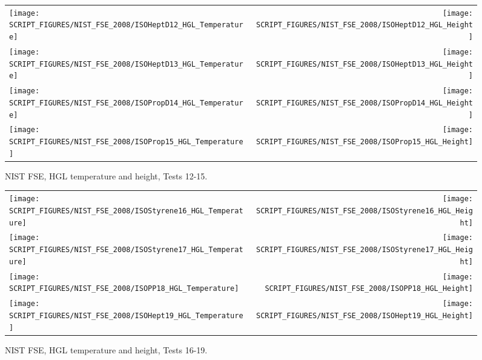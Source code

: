 \begin{figure}[p]
\begin{tabular*}{\textwidth}{l@{\extracolsep{\fill}}r}
\texttt{[image: SCRIPT\_FIGURES/NIST\_FSE\_2008/ISOHeptD12\_HGL\_Temperature]} &
\texttt{[image: SCRIPT\_FIGURES/NIST\_FSE\_2008/ISOHeptD12\_HGL\_Height]} \\
\texttt{[image: SCRIPT\_FIGURES/NIST\_FSE\_2008/ISOHeptD13\_HGL\_Temperature]} &
\texttt{[image: SCRIPT\_FIGURES/NIST\_FSE\_2008/ISOHeptD13\_HGL\_Height]} \\
\texttt{[image: SCRIPT\_FIGURES/NIST\_FSE\_2008/ISOPropD14\_HGL\_Temperature]} &
\texttt{[image: SCRIPT\_FIGURES/NIST\_FSE\_2008/ISOPropD14\_HGL\_Height]} \\
\texttt{[image: SCRIPT\_FIGURES/NIST\_FSE\_2008/ISOProp15\_HGL\_Temperature]} &
\texttt{[image: SCRIPT\_FIGURES/NIST\_FSE\_2008/ISOProp15\_HGL\_Height]}
\end{tabular*}
\caption[NIST FSE, HGL temperature and height, Tests 12-15]
{NIST FSE, HGL temperature and height, Tests 12-15.}
\label{NIST_FSE_2008_HGL_Temp_2}
\end{figure}

\begin{figure}[p]
\begin{tabular*}{\textwidth}{l@{\extracolsep{\fill}}r}
\texttt{[image: SCRIPT\_FIGURES/NIST\_FSE\_2008/ISOStyrene16\_HGL\_Temperature]} &
\texttt{[image: SCRIPT\_FIGURES/NIST\_FSE\_2008/ISOStyrene16\_HGL\_Height]} \\
\texttt{[image: SCRIPT\_FIGURES/NIST\_FSE\_2008/ISOStyrene17\_HGL\_Temperature]} &
\texttt{[image: SCRIPT\_FIGURES/NIST\_FSE\_2008/ISOStyrene17\_HGL\_Height]} \\
\texttt{[image: SCRIPT\_FIGURES/NIST\_FSE\_2008/ISOPP18\_HGL\_Temperature]} &
\texttt{[image: SCRIPT\_FIGURES/NIST\_FSE\_2008/ISOPP18\_HGL\_Height]} \\
\texttt{[image: SCRIPT\_FIGURES/NIST\_FSE\_2008/ISOHept19\_HGL\_Temperature]} &
\texttt{[image: SCRIPT\_FIGURES/NIST\_FSE\_2008/ISOHept19\_HGL\_Height]}
\end{tabular*}
\caption[NIST FSE, HGL temperature and height, Tests 16-19]
{NIST FSE, HGL temperature and height, Tests 16-19.}
\label{NIST_FSE_2008_HGL_Temp_3}
\end{figure}

